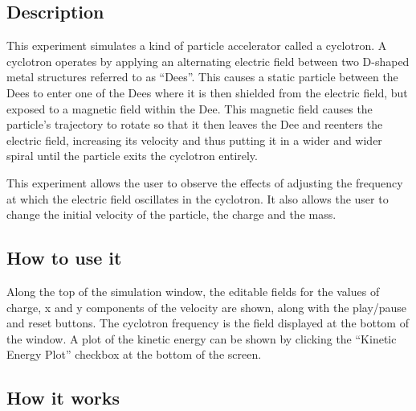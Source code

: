 \subsection*{Description}
\label{sec-1-1}

This experiment simulates a kind of particle accelerator called a
cyclotron. A cyclotron operates by applying an alternating electric
field between two D-shaped metal structures referred to as
``Dees''. This causes a static particle between the Dees to enter one of
the Dees where it is then shielded from the electric field, but
exposed to a magnetic field within the Dee. This magnetic field
causes the particle's trajectory to rotate so that it then leaves the Dee and reenters the electric field, increasing its velocity and thus putting it in a wider and wider spiral until the particle exits the cyclotron entirely.

This experiment allows the user to observe the effects of adjusting
the frequency at which the electric field oscillates in the
cyclotron. It also allows the user to change the initial velocity of
the particle, the charge and the mass.
\subsection*{How to use it}
\label{sec-1-2}

Along the top of the simulation window, the editable fields for the
values of charge, x and y components of the velocity are shown, along
with the play/pause and reset buttons.
The cyclotron frequency is the field displayed at the bottom of the
window. A plot of the kinetic energy can be shown by clicking the
``Kinetic Energy Plot'' checkbox at the bottom of the screen.
\subsection*{How it works}
\label{sec-1-3}
